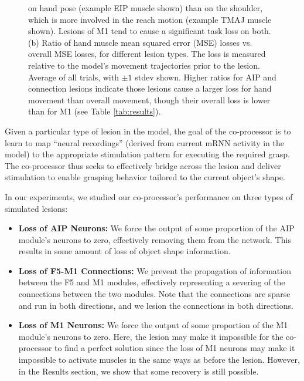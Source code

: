 \documentclass[12pt]{iopart}
\begin{document}
\begin{figure}[h]
{             on hand pose (example EIP muscle shown) than on the shoulder, which is more
             involved in the reach motion (example TMAJ muscle shown). Lesions of M1
             tend to cause a significant task loss on both.
             (b) Ratio of hand muscle mean squared error (MSE) losses vs. overall MSE
             losses, for different lesion types. The loss is measured relative to the
             model's movement trajectories prior to the lesion. Average of all trials,
             with $\pm1$ stdev shown. Higher ratios for AIP and connection lesions indicate those
             lesions cause a larger loss for hand movement than overall movement, though
             their overall loss is lower than for M1 (see Table \ref{tab:results}).}
	\label{fig:lesion}
\end{figure}

Given a particular type of lesion in the model, the goal of the co-processor is to learn
to map ``neural recordings'' (derived from current mRNN  activity in the model)
to the appropriate stimulation pattern for executing the required grasp. The
co-processor thus seeks to effectively bridge across the lesion and deliver
stimulation to enable grasping behavior tailored to the current object's shape.

In our experiments, we studied our co-processor's performance on three types of
simulated lesions:
\begin{itemize}
	\item \textbf{Loss of AIP Neurons:} We force the output of some proportion of the AIP module's
	      neurons to zero, effectively removing them from the network. This results in some amount of 
	      loss of object shape information.
	\item \textbf{Loss of F5-M1 Connections:} We prevent the propagation of
	      information between the F5 and M1 modules, effectively representing a
	      severing of the connections between the two modules. Note that the connections are sparse
	      and run in both directions, and we lesion the connections in both directions.
	\item \textbf{Loss of M1 Neurons:} We force the output of some proportion of the M1 module's
	      neurons to zero. Here, the lesion may make it impossible for the co-processor
	      to find a perfect solution since the loss of M1 neurons may make it impossible to
	      activate muscles in the same ways as before the lesion. However, in the Results section,
        we show that some recovery is still possible.
\end{itemize}
\end{document}
